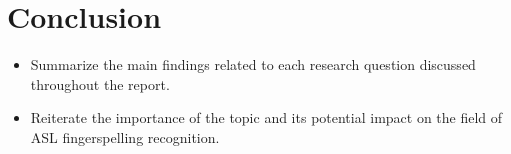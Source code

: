 \section{Conclusion}

\begin{itemize}
    \item Summarize the main findings related to each research question discussed throughout the report.
    \item Reiterate the importance of the topic and its potential impact on the field of ASL fingerspelling recognition.
\end{itemize}
